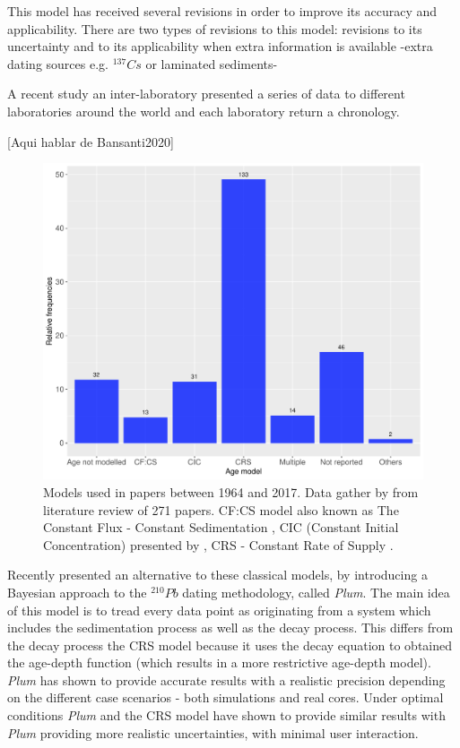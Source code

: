 \documentclass [10pt] {article}
\begin{document}
This model has received several revisions  in order to improve its accuracy and applicability. 
There are two types of revisions to this model: revisions to its uncertainty \citep{Binford1990,Sanchez-Cabeza2014} and to its applicability when extra information is available -extra dating sources e.g. $^{137}Cs$ or laminated sediments- \citep{Appleby1998,Appleby2001,Appleby2008}

A recent study \citep{Barsanti2020} an inter-laboratory presented a series of data to different laboratories around the world and each laboratory return a chronology. 

[Aqui hablar de Bansanti2020]

\begin{figure}[h!]
	\begin{centering}
		\includegraphics[width=.75\linewidth]{210Pbmodels-bar}
		\caption{Models used in papers between 1964 and 2017. Data gather by \citet{Courtney2019} from literature review of 271 papers. CF:CS model also known as The Constant Flux - Constant Sedimentation \citep{Robbins1978}, CIC (Constant Initial Concentration) presented by \citet{Goldberg1963,Crozaz1964,Robbins1978}, CRS - Constant Rate of Supply \citep{Appleby1978,Robbins1978}. }
		\label{fig:210models}
	\end{centering}
\end{figure}

Recently \citet{Aquino2018} presented an alternative to these classical models, by introducing a Bayesian approach to the $^{210}Pb$ dating methodology, called \textit{Plum}. 
The main idea of this model is to tread every data point as originating from a system which includes the sedimentation process as well as the decay process. 
This differs from the decay process the CRS model because it uses the decay equation to obtained the age-depth function (which results in a more restrictive age-depth model).
\textit{Plum} has shown to provide accurate results with a realistic precision depending on the different case scenarios \citep{Aquino2018,Aquino2020} - both simulations and real cores.
Under optimal conditions \textit{Plum} and the CRS model have shown to provide similar results \citep{Aquino2020} with \textit{Plum} providing more realistic uncertainties, with minimal user interaction. 
\end{document}
